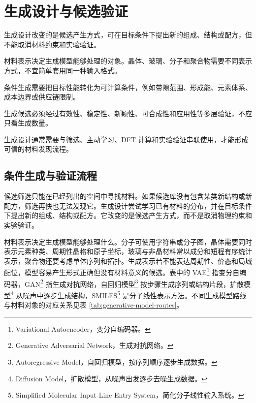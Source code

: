 \clearpage
\section{生成设计与候选验证}


\begin{sectionkeypoints}
\item 生成设计改变的是候选产生方式，可在目标条件下提出新的组成、结构或配方，但不能取消材料约束和实验验证。
\item 材料表示决定生成模型能够处理的对象。晶体、玻璃、分子和聚合物需要不同表示方式，不宜简单套用同一种输入格式。
\item 条件生成需要把目标性能转化为可计算条件，例如带隙范围、形成能、元素体系、成本边界或供应链限制。
\item 生成候选必须经过有效性、稳定性、新颖性、可合成性和应用性等多层验证，不应只看生成数量。
\item 生成设计通常需要与筛选、主动学习、DFT 计算和实验验证串联使用，才能形成可信的材料发现流程。
\end{sectionkeypoints}

\subsection{条件生成与验证流程}

候选筛选只能在已经列出的空间中寻找材料。如果候选库没有包含某类新结构或新配方，筛选再快也无法发现它。生成设计尝试学习已有材料的分布，并在目标条件下提出新的组成、结构或配方。它改变的是候选产生方式，而不是取消物理约束和实验验证。


材料表示决定生成模型能够处理什么。分子可使用字符串或分子图，晶体需要同时表示元素种类、周期性晶格和原子坐标，玻璃与非晶材料常以成分和短程有序统计表示，聚合物还要考虑单体序列和拓扑。生成表示若不能表达周期性、价态和局域配位，模型容易产生形式正确但没有材料意义的候选。表中的 VAE\footnote{Variational Autoencoder，变分自编码器。} 指变分自编码器，GAN\footnote{Generative Adversarial Network，生成对抗网络。} 指生成对抗网络，自回归模型\footnote{Autoregressive Model，自回归模型，按序列顺序逐步生成数据。} 按步骤生成序列或结构片段，扩散模型\footnote{Diffusion Model，扩散模型，从噪声出发逐步去噪生成数据。} 从噪声中逐步生成结构，SMILES\footnote{Simplified Molecular Input Line Entry System，简化分子线性输入系统。} 是分子线性表示方法。不同生成模型路线与材料对象的对应关系见表 \ref{tab:generative-model-routes}。



